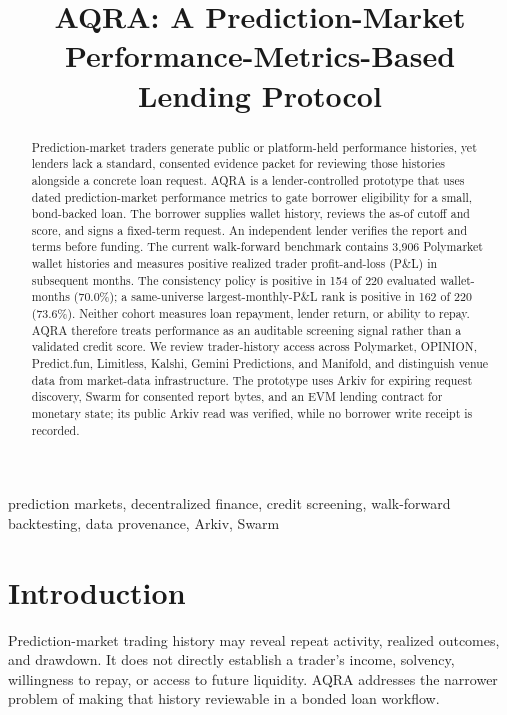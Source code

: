 \documentclass[conference]{IEEEtran}
\title{AQRA: A Prediction-Market Performance-Metrics-Based Lending Protocol}
\author{\IEEEauthorblockN{Debojyoti De Majumder, Sylvia Barick, Swarupa Saha, and Ahir Sarkar}
\IEEEauthorblockA{Institute of Engineering and Management, Kolkata}}
\begin{document}
\maketitle

\begin{abstract}
Prediction-market traders generate public or platform-held performance histories, yet lenders lack a standard, consented evidence packet for reviewing those histories alongside a concrete loan request. AQRA is a lender-controlled prototype that uses dated prediction-market performance metrics to gate borrower eligibility for a small, bond-backed loan. The borrower supplies wallet history, reviews the as-of cutoff and score, and signs a fixed-term request. An independent lender verifies the report and terms before funding. The current walk-forward benchmark contains 3,906 Polymarket wallet histories and measures positive realized trader profit-and-loss (P\&L) in subsequent months. The consistency policy is positive in 154 of 220 evaluated wallet-months (70.0\%); a same-universe largest-monthly-P\&L rank is positive in 162 of 220 (73.6\%). Neither cohort measures loan repayment, lender return, or ability to repay. AQRA therefore treats performance as an auditable screening signal rather than a validated credit score. We review trader-history access across Polymarket, OPINION, Predict.fun, Limitless, Kalshi, Gemini Predictions, and Manifold, and distinguish venue data from market-data infrastructure. The prototype uses Arkiv for expiring request discovery, Swarm for consented report bytes, and an EVM lending contract for monetary state; its public Arkiv read was verified, while no borrower write receipt is recorded.
\end{abstract}

\begin{IEEEkeywords}
prediction markets, decentralized finance, credit screening, walk-forward backtesting, data provenance, Arkiv, Swarm
\end{IEEEkeywords}

\section{Introduction}
Prediction-market trading history may reveal repeat activity, realized outcomes, and drawdown. It does not directly establish a trader's income, solvency, willingness to repay, or access to future liquidity. AQRA addresses the narrower problem of making that history reviewable in a bonded loan workflow.
\end{document}
